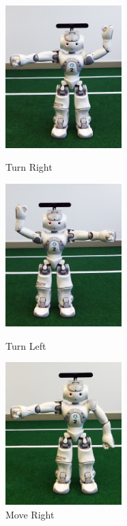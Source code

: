 \begin{figure}
	[h]	 	
	\begin{minipage}
		{.3 
			\textwidth}  		
		\includegraphics[height=55mm]{figures/result/nao-gg-turn-right.jpg} \caption*{Turn Right } 
	\end{minipage}
	\begin{minipage}
		{.3 
			\textwidth}  
		
		\includegraphics[height=55mm]{figures/result/nao-gg-turn-left.jpg} \caption*{Turn Left }
	\end{minipage}
	\begin{minipage}
		{.3
			\textwidth}  
		
		\includegraphics[height=55mm]{figures/result/nao-gg-move-right.jpg} \caption*{Move Right}
	\end{minipage}
	\begin{minipage}
		{.3
			\textwidth}  
		

\end{minipage}
\end{figure}
